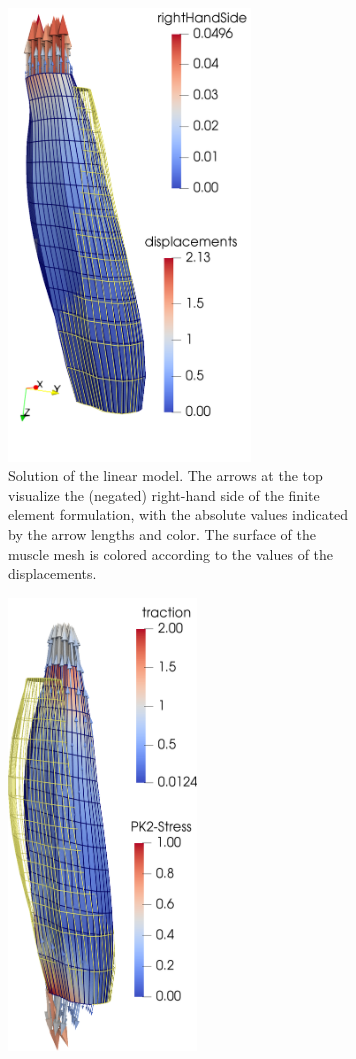 \begin{figure}
  \centering%
  \hfill
  \begin{subfigure}[t]{0.4\textwidth}%
    \centering%
    \includegraphics[height=12cm]{images/results/basic/lin_nonlin_muscle_mechanics_b.png}%
    \caption{Solution of the linear model. The arrows at the top visualize the (negated) right-hand side of the finite element formulation, with the absolute values indicated by the arrow lengths and color. The surface of the muscle mesh is colored according to the values of the displacements.}%
    \label{fig:lin_nonlin_muscle_mechanics_b}%
  \end{subfigure}\hfill
  \begin{subfigure}[t]{0.4\textwidth}%
    \centering%
    \includegraphics[height=12cm]{images/results/basic/lin_nonlin_muscle_mechanics_a.png}%

\end{subfigure}
\end{figure}
